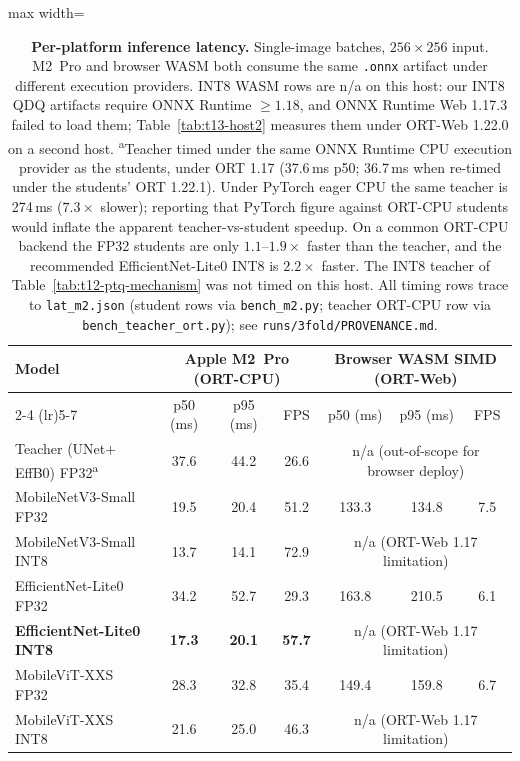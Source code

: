 \begin{table}[ht]
\centering
\caption{\textbf{Per-platform inference latency.} Single-image batches, $256{\times}256$ input. M2~Pro and browser WASM both consume the same \texttt{.onnx} artifact under different execution providers. INT8 WASM rows are n/a on this host: our INT8 QDQ artifacts require ONNX Runtime $\geq 1.18$, and ONNX Runtime Web 1.17.3 failed to load them; Table~\ref{tab:t13-host2} measures them under ORT-Web 1.22.0 on a second host. \textsuperscript{a}Teacher timed under the same ONNX Runtime CPU execution provider as the students, under ORT 1.17 (37.6\,ms p50; 36.7\,ms when re-timed under the students' ORT 1.22.1). Under PyTorch eager CPU the same teacher is 274\,ms ($7.3\times$ slower); reporting that PyTorch figure against ORT-CPU students would inflate the apparent teacher-vs-student speedup. On a common ORT-CPU backend the FP32 students are only $1.1$--$1.9\times$ faster than the teacher, and the recommended EfficientNet-Lite0 INT8 is $2.2\times$ faster. The INT8 teacher of Table~\ref{tab:t12-ptq-mechanism} was not timed on this host. All timing rows trace to \texttt{lat\_m2.json} (student rows via \texttt{bench\_m2.py}; teacher ORT-CPU row via \texttt{bench\_teacher\_ort.py}); see \texttt{runs/3fold/PROVENANCE.md}.}
\label{tab:t5-latency}
\small
\setlength{\tabcolsep}{5pt}
\begin{adjustbox}{max width=\textwidth}
\begin{tabular}{lcccccc}
\toprule
\multirow{2}{*}{\textbf{Model}}
  & \multicolumn{3}{c}{\textbf{Apple M2~Pro (ORT-CPU)}}
  & \multicolumn{3}{c}{\textbf{Browser WASM SIMD (ORT-Web)}} \\
\cmidrule(lr){2-4} \cmidrule(lr){5-7}
  & p50 (ms) & p95 (ms) & FPS  & p50 (ms) & p95 (ms) & FPS  \\
\midrule
Teacher (UNet$+$EffB0) FP32\textsuperscript{a} & 37.6 & 44.2 & 26.6 & \multicolumn{3}{c}{n/a (out-of-scope for browser deploy)} \\
\midrule
MobileNetV3-Small FP32             &  19.5 &  20.4 & 51.2  & 133.3 & 134.8 & 7.5 \\
MobileNetV3-Small INT8             &  13.7 &  14.1 & 72.9  & \multicolumn{3}{c}{n/a (ORT-Web 1.17 limitation)} \\
EfficientNet-Lite0 FP32            &  34.2 &  52.7 & 29.3  & 163.8 & 210.5 & 6.1 \\
\textbf{EfficientNet-Lite0 INT8}   &  \textbf{17.3} & \textbf{20.1} & \textbf{57.7} & \multicolumn{3}{c}{n/a (ORT-Web 1.17 limitation)} \\
MobileViT-XXS FP32                 &  28.3 &  32.8 & 35.4  & 149.4 & 159.8 & 6.7 \\
MobileViT-XXS INT8                 &  21.6 &  25.0 & 46.3  & \multicolumn{3}{c}{n/a (ORT-Web 1.17 limitation)} \\
\bottomrule
\end{tabular}
\end{adjustbox}
\end{table}
